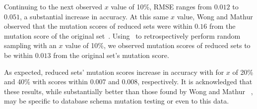 Continuing to the next observed $x$ value of 10\%, RMSE ranges from $0.012$ to $0.051$, a
substantial increase in accuracy. At this same  $x$ value, Wong and Mathur observed that the mutation scores of reduced sets were
within $0.16$ from the mutation score of the original set~\cite{mathur1994empirical, wong1993mutation}. Using \mr~to retrospectively
perform random sampling with an $x$ value of 10\%, we observed mutation scores of reduced sets to be within $0.013$ from the original
set's mutation score.

As expected, reduced sets' mutation scores increase in accuracy with for $x$ of 20\% and 40\% with scores within 0.007 and 0.008,
respectively. It is acknowledged that these results, while substantially better than those found by Wong and Mathur
~\cite{mathur1994empirical, wong1993mutation}, may be specific to database schema mutation testing or even to this data.


